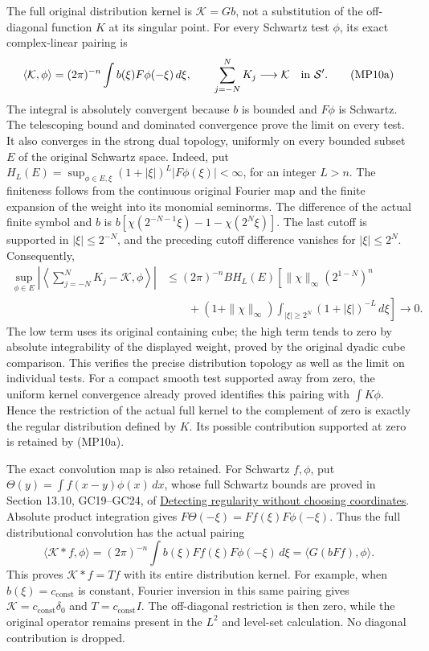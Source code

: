 \documentclass[
  11pt,
]{article}
\begin{document}
The full original distribution kernel is \(\mathcal K=Gb\), not a
substitution of the off-diagonal function \(K\) at its singular point.
For every Schwartz test \(\phi\), its exact complex-linear pairing is \[
 \langle\mathcal K,\phi\rangle
   =(2\pi)^{-n}\int b(\xi)F\phi(-\xi)\,d\xi,\qquad
 \sum_{j=-N}^NK_j\longrightarrow\mathcal K
                         \quad\hbox{in }\mathcal S' .
                                                               \tag{MP10a}
\] The integral is absolutely convergent because \(b\) is bounded and
\(F\phi\) is Schwartz. The telescoping bound and dominated convergence
prove the limit on every test. It also converges in the strong dual
topology, uniformly on every bounded subset \(E\) of the original
Schwartz space. Indeed, put
\(H_L(E)=\sup_{\phi\in E,\xi}(1+|\xi|)^L|F\phi(\xi)|<\infty\), for an
integer \(L>n\). The finiteness follows from the continuous original
Fourier map and the finite expansion of the weight into its monomial
seminorms. The difference of the actual finite symbol and \(b\) is
\(b[\chi(2^{-N-1}\xi)-1-\chi(2^N\xi)]\). The last cutoff is supported in
\(|\xi|\leq2^{-N}\), and the preceding cutoff difference vanishes for
\(|\xi|\leq2^N\). Consequently, \[
 \begin{split}
 \sup_{\phi\in E}\left|
    \left\langle\sum_{j=-N}^NK_j-\mathcal K,\phi\right\rangle\right|
 &\leq(2\pi)^{-n}B H_L(E)
 \left[\|\chi\|_\infty(2^{1-N})^n\right.\\
 &\left.\qquad+(1+\|\chi\|_\infty)
                \int_{|\xi|\geq2^N}(1+|\xi|)^{-L}\,d\xi\right]
 \longrightarrow0 .
 \end{split}                                                   \tag{MP10b}
\] The low term uses its original containing cube; the high term tends
to zero by absolute integrability of the displayed weight, proved by the
original dyadic cube comparison. This verifies the precise distribution
topology as well as the limit on individual tests. For a compact smooth
test supported away from zero, the uniform kernel convergence already
proved identifies this pairing with \(\int K\phi\). Hence the
restriction of the actual full kernel to the complement of zero is
exactly the regular distribution defined by \(K\). Its possible
contribution supported at zero is retained by (MP10a).

The exact convolution map is also retained. For Schwartz \(f,\phi\), put
\(\Theta(y)=\int f(x-y)\phi(x)\,dx\), whose full Schwartz bounds are
proved in Section 13.10, GC19--GC24, of
\href{geometric-microlocal-calculus.pdf}{Detecting regularity without
choosing coordinates}. Absolute product integration gives
\(F\Theta(-\xi)=Ff(\xi)F\phi(-\xi)\). Thus the full distributional
convolution has the actual pairing \[
 \langle\mathcal K*f,\phi\rangle
   =(2\pi)^{-n}\int b(\xi)Ff(\xi)F\phi(-\xi)\,d\xi
   =\langle G(bFf),\phi\rangle .
\] This proves \(\mathcal K*f=Tf\) with its entire distribution kernel.
For example, when \(b(\xi)=c_{\mathrm{const}}\) is constant, Fourier
inversion in this same pairing gives
\(\mathcal K=c_{\mathrm{const}}\delta_0\) and \(T=c_{\mathrm{const}}I\).
The off-diagonal restriction is then zero, while the original operator
remains present in the \(L^2\) and level-set calculation. No diagonal
contribution is dropped.
\end{document}
